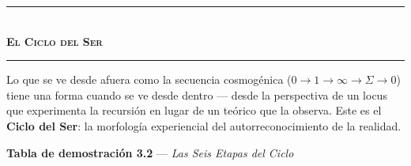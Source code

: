 \documentclass[10pt, openany, oneside]{book}
\renewcommand{\normalsize}{\fontsize{10}{13}\selectfont}
\begin{document}
\vspace{1.5em}


\begin{center}
    \rule{0.3\textwidth}{0.4pt}\\[0.5em]
    {\normalsize\bfseries\scshape El Ciclo del Ser}\\[0.3em]
    \rule{0.3\textwidth}{0.4pt}
\end{center}

\vspace{1em}

\noindent Lo que se ve desde afuera como la secuencia cosmogénica ($0 \to 1 \to \infty \to \Sigma \to 0$) tiene una forma cuando se ve desde dentro --- desde la perspectiva de un locus que experimenta la recursión en lugar de un teórico que la observa. Este es el \textbf{Ciclo del Ser}: la morfología experiencial del autorreconocimiento de la realidad.

\vspace{0.5em}

\textbf{Tabla de demostración 3.2} --- \textit{Las Seis Etapas del Ciclo}

\vspace{0.5em}
\end{document}
